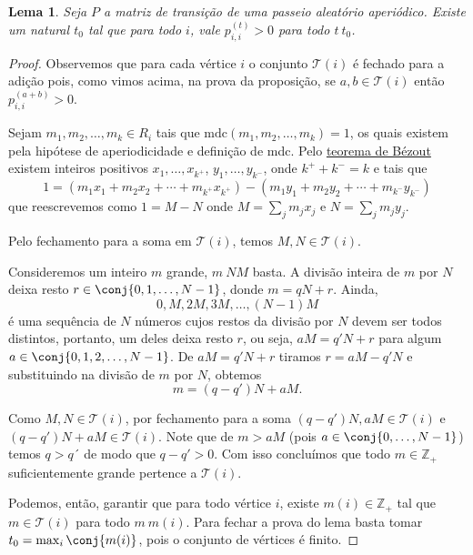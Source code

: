 \documentclass[12pt,letterpaper]{article}
\newtheorem{lema}      [teorema] {Lema}
\def\Z{\mathbb Z}
\begin{document}
\begin{lema}\label{lema:aperiodico}
  Seja $P$ a matriz de transição de uma passeio aleatório
  aperiódico. Existe um natural $t_0$ tal que para todo $i$, vale
  $p_{i,i}^{(t)}>0$ para todo $t\> t_0$.
\end{lema}
\begin{proof}
  Observemos que para cada vértice $i$ o conjunto $\mathcal T(i)$ é
  fechado para a adição pois, como vimos acima, na prova da proposição,
  se $a,b\in \mathcal T(i)$ então $p_{i,i}^{(a+b)}>0$.

  Sejam $m_1,m_2,\dots,m_k \in R_i$ tais que
  $\mathrm{mdc}( m_1,m_2,\dots,m_k)=1$, os quais existem pela hipótese
  de aperiodicidade e definição de mdc.  Pelo 
  \href{https://en.wikipedia.org/wiki/B\%C3\%A9zout\%27s\_identity}{teorema de Bézout} existem inteiros positivos $x_1,\dots,x_{k^+}$,
  $y_1,\dots,y_{k^-}$, onde $k^+ + k^- = k$ e tais que
  \[
    1= (m_1x_1+m_2x_2+\cdots+m_{k^+}x_{k^+}) -
     (m_1y_1+m_2y_2+\cdots+m_{k^-}y_{k^-})
  \]
  que reescrevemos como $1 = M - N$ onde $M = \sum_j m_jx_j$ e
  $N = \sum_j m_jy_j$.

  Pelo fechamento para a soma em $ \mathcal T(i)$, temos
  $M,N\in \mathcal T(i)$.

  Consideremos um inteiro $m$ grande, $m\> N M$ basta. A divisão
  inteira de $m$ por $N$ deixa resto $r\in \conj{0,1,\dots,N-1}$, donde
  $m = qN+r$. Ainda,  
  $$
  0, M, 2M, 3M, \dots, (N-1)M
  $$
  é uma sequência de $N$ números cujos restos da divisão por $N$ devem
  ser todos distintos, portanto, um deles deixa resto $r$, ou seja,
  $aM = q'N +r$ para algum $a\in \conj{0, 1, 2, \dots, N-1}$. De
  $aM = q'N +r$ tiramos $r= aM - q'N$ e substituindo na divisão de $m$
  por $N$, obtemos
  $$
  m = (q-q')N +aM.
  $$

  Como $M,N\in \mathcal T(i)$, por fechamento para a soma
  $(q-q')N, aM\in \mathcal T(i)$ e $(q-q')N +aM\in \mathcal T(i)$. Note
  que de $m > aM$ (pois $a\in \conj{0, \dots, N-1}$) temos $q>q´$ de
  modo que $q-q'>0$. Com isso concluímos que todo $m\in\Z_+$
  suficientemente grande pertence a $\mathcal T(i)$.

  
  Podemos, então, garantir que para todo vértice $i$, existe
  $m(i)\in\Z_+$ tal que $m\in \mathcal T(i)$ para todo $m\>m(i)$. Para
  fechar a prova do lema basta tomar $t_0 = \max_i\conj{m(i)}$, pois o
  conjunto de vértices é finito.
\end{proof}
\end{document}
